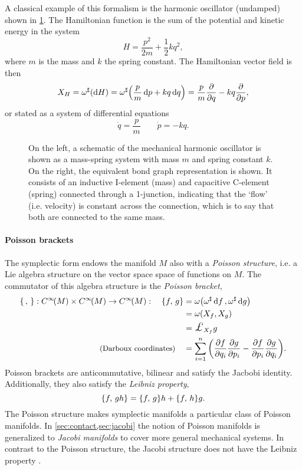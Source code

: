 A classical example of this formalism is the harmonic oscillator (undamped) shown in \cref{fig:ho}. The Hamiltonian function is the sum of the potential and kinetic energy in the system
$$ H = \frac{p^2}{2m} + \frac{1}{2}kq^2,$$
where $m$ is the mass and $k$ the spring constant. The Hamiltonian vector field is then 
$$ X_H = \omega^\sharp\qty(\dd{H}) = \omega^\sharp\qty(\frac{p}{m}\dd{p} + kq\dd{q}) = \frac{p}{m}\pdv{}{q} - kq \pdv{}{p}, $$
or stated as a system of differential equations
$$ \dot{q} = \frac{p}{m} \qquad \dot{p} = -kq. $$
\begin{figure}[ht]
    \centering
    
    \caption{On the left, a schematic of the mechanical harmonic oscillator is shown as a mass-spring system with mass $m$ and spring constant $k$. On the right, the equivalent bond graph representation is shown. It consists of an inductive I-element (mass) and capacitive C-element (spring) connected through a 1-junction, indicating that the `flow' (i.e. velocity) is constant across the connection, which is to say that both are connected to the same mass.}
    \label{fig:ho}
\end{figure}

\paragraph{Poisson brackets} The symplectic form endows the manifold $M$ also with a \emph{Poisson structure}, i.e. a Lie algebra structure on the vector space space of functions on $M$. The commutator of this algebra structure is the \emph{Poisson bracket},
\begin{equation}
    \begin{split}
        \poisson{\,}{}: \functions{M} \times \functions{M} \to \functions{M}: \quad  
        \poisson{f}{g} &= \omega\qty(\fromDual{\omega}\dd{f}, \fromDual{\omega}\dd{g})  \\
                       &= \omega\qty(X_f, X_g) \\
                       &= \lied{X_f}{g} \\
        \text{\small (Darboux coordinates)} \quad &= \sum_{i = 1}^n \qty(\pdv{f}{q_i}\pdv{g}{p_i} - \pdv{f}{p_i}\pdv{g}{q_i}).
    \end{split}
\end{equation}
Poisson brackets are anticommutative, bilinear and satisfy the Jacbobi identity. Additionally, they also satisfy the \emph{Leibniz property}, 
$$ 
    \qty{f,\,gh} = \qty{f,\,g} h + \qty{f,\,h} g. 
$$
The Poisson structure makes symplectic manifolds a particular class of Poisson manifolds. In \cref{sec:contact,sec:jacobi} the notion of Poisson manifolds is generalized to \emph{Jacobi manifolds} to cover more general mechanical systems. In contrast to the Poisson structure, the Jacobi structure does not have the Leibniz property \cite{Arnold1989,Libermann1987}.

